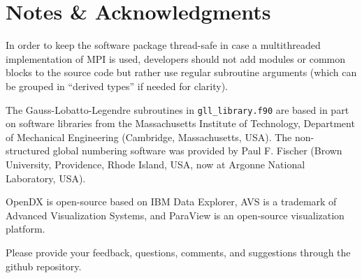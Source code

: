 
\chapter*{Notes \& Acknowledgments}

In order to keep the software package thread-safe in case a multithreaded
implementation of MPI is used, developers should not add modules or
common blocks to the source code but rather use regular subroutine
arguments (which can be grouped in ``derived types'' if needed for
clarity).\newline

The Gauss-Lobatto-Legendre subroutines in \texttt{gll\_library.f90}
are based in part on software libraries from the Massachusetts Institute
of Technology, Department of Mechanical Engineering (Cambridge, Massachusetts,
USA). The non-structured global numbering software was provided by
Paul F. Fischer (Brown University, Providence, Rhode Island, USA,
now at Argonne National Laboratory, USA).\newline

OpenDX  is open-source
based on IBM Data Explorer, AVS 
is a trademark of Advanced Visualization Systems, and ParaView 
is an open-source visualization platform.\newline

Please provide your feedback, questions, comments, and suggestions through the github repository.

